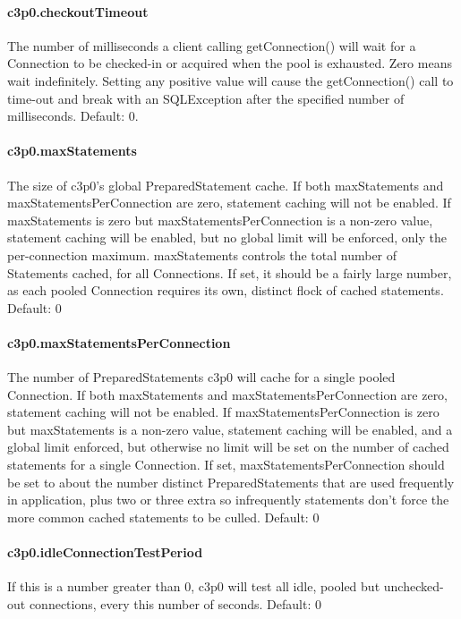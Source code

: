 \paragraph{c3p0.checkoutTimeout}
The number of milliseconds a client calling getConnection() will wait for a Connection
to be checked-in or acquired when the pool is exhausted. Zero means wait indefinitely.
Setting any positive value will cause the getConnection() call to time-out and
break with an SQLException after the specified number of milliseconds.
Default: 0.

\paragraph{c3p0.maxStatements}
The size of c3p0's global PreparedStatement cache. If both maxStatements and
maxStatementsPerConnection are zero, statement caching will not be enabled.
If maxStatements is zero but maxStatementsPerConnection is a non-zero value,
statement caching will be enabled, but no global limit will be enforced, only
the per-connection maximum. maxStatements controls the total number of Statements
cached, for all Connections. If set, it should be a fairly large number, as each
pooled Connection requires its own, distinct flock of cached statements.
Default: 0

\paragraph{c3p0.maxStatementsPerConnection}
The number of PreparedStatements c3p0 will cache for a single pooled Connection.
If both maxStatements and maxStatementsPerConnection are zero, statement caching
will not be enabled. If maxStatementsPerConnection is zero but maxStatements is
a non-zero value, statement caching will be enabled, and a global limit enforced,
but otherwise no limit will be set on the number of cached statements for a single
Connection. If set, maxStatementsPerConnection should be set to about the number
distinct PreparedStatements that are used frequently in application, plus
two or three extra so infrequently statements don't force the more common cached
statements to be culled.
Default: 0

\paragraph{c3p0.idleConnectionTestPeriod}
If this is a number greater than 0, c3p0 will test all idle, pooled but unchecked-out
connections, every this number of seconds.
Default: 0

